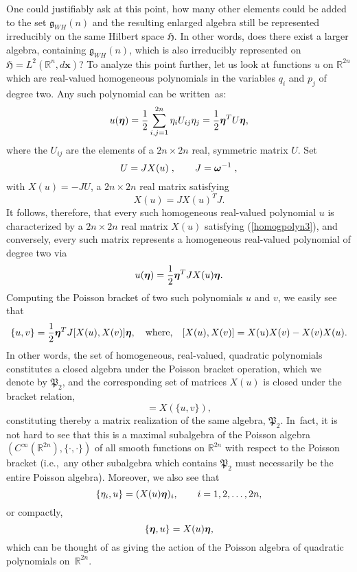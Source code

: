 \documentclass[12pt]{amsart}
\numberwithin{equation}{section}
\theoremstyle{remark}
\newcommand\HH{\mathfrak H}
\newcommand\RR{\mathbb R}
\newcommand{\be}{\begin{equation}}
\newcommand{\en}{\end{equation}}
\newcommand{\bomega}{\mbox{\boldmath $\omega$}}
\newcommand{\bfeta}{\mbox{\boldmath $\eta$}}
\newcommand{\bx}{\mathbf x}
\begin{document}
One could justifiably ask at this point, how many other elements
could be added to the set ${\mathfrak g}_{WH}(n)$ and the
resulting enlarged algebra still be represented irreducibly on the
same Hilbert space $\HH$. In other words, does there exist a larger
algebra, containing ${\mathfrak g}_{WH}(n)$, which is also irreducibly
represented on $\HH = L^{2}({\mathbb R}^{n}, d\bx )$? To analyze this
point further, let us look at functions
$u$ on ${\mathbb R}^{2n}$ which are real-valued homogeneous polynomials in the
variables $q_i$ and $p_j$ of degree two. Any such polynomial can be written~as:
\be
   u(\bfeta ) = \frac 12 \sum_{i,j = 1}^{2n}\eta_i U_{ij}\eta_j
        = \frac 12 \bfeta^{T}U\bfeta ,
\label{homogpolyn1}
\en
where the $U_{ij}$ are the elements of a $2n\times 2n$ real, symmetric matrix
$U$. Set
\be
     U = JX(u)\; , \qquad J = \bomega^{-1}\; ,
\label{homogpolyn2}
\en
with $X(u) = -JU$, a $2n\times 2n$ real matrix satisfying
\be
    X(u) = JX(u)^{T}J.
\label{homogpolyn3}
\en
It follows, therefore, that every such homogeneous real-valued
polynomial $u$ is characterized
by a $2n\times 2n$ real matrix  $X(u)$ satisfying (\ref{homogpolyn3}),
and conversely, every such matrix represents a homogeneous
real-valued
polynomial of degree two via
\be
    u(\bfeta )= \frac 12 \bfeta^{T}JX(u)\bfeta .
\label{homogpolyn4}
\en
Computing the Poisson bracket of two such polynomials $u$ and $v$, we easily
see that
\be
  \{u ,v\} = \frac 12 \bfeta^{T}J[X(u), X(v)]\bfeta,
\quad \mbox{\rm where,} \quad [X(u), X(v)] = X(u)X(v)- X(v)X(u).
\label{homogpolyn5}
\en
In other words, the set of homogeneous, real-valued, quadratic polynomials
constitutes a closed algebra under the Poisson bracket operation, which we
denote by ${\mathfrak P}_2$, and the corresponding set of matrices $X(u)$ is
closed under the bracket relation,
\be
  [X(u), X(v)] = X(\{u, v\}),
\label{homogpolyn6}
\en
constituting thereby a matrix realization of the same algebra,
${\mathfrak P}_2$. In~fact, it is not hard to see that this is a maximal
subalgebra of the Poisson algebra $(C^\infty(\RR^{2n}),\{\cdot,\cdot\})$
of all smooth functions on $\RR^{2n}$ with respect to the Poisson bracket
(i.e.,~any other subalgebra which contains ${\mathfrak P}_2$ must necessarily
be the entire Poisson algebra). Moreover, we also see that
\be
  \{\eta_i, u\} = (X(u)\bfeta)_i, \qquad i=1,2, \ldots , 2n,
\label{semidirprod1}
\en
or compactly,
\be
   \{\bfeta, u\} = X(u)\bfeta,
\label{semidirprod2}
\en
which can be thought of as giving the action of the Poisson algebra of
quadratic polynomials on~${\mathbb R}^{2n}$.
\end{document}
